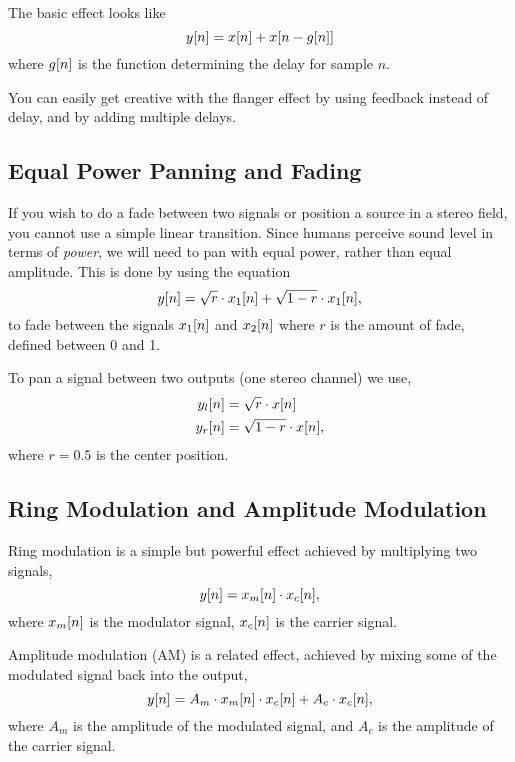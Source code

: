 \documentclass[11pt]{article}
\let\originalleft\left
\let\originalright\right
\renewcommand{\left}{\mathopen{}\mathclose\bgroup\originalleft}
\renewcommand{\right}{\aftergroup\egroup\originalright}
\def\lsqb{\left[}
\def\rsqb{\right]}
\def\sqb#1{\lsqb #1 \rsqb}
\def\ysig{y\sqb{n}}
\begin{document}
The basic effect looks like
\begin{equation}
	\ysig = x\sqb{n} + x\sqb{n - g\sqb{n}}
\end{equation}
where $g\sqb{n}$ is the function determining the delay for sample $n$.

You can easily get creative with the flanger effect by using feedback instead of delay, and by adding multiple delays.

\subsection{Equal Power Panning and Fading}
If you wish to do a fade between two signals or position a source in a stereo field, you cannot use a simple linear transition. Since humans perceive sound level in terms of \textit{power}, we will need to pan with equal power, rather than equal amplitude. This is done by using the equation
\begin{equation}
	\ysig = \sqrt{r} \cdot x_1\sqb{n} + \sqrt{1 - r} \cdot x_1\sqb{n},
\end{equation}
to fade between the signals $x_1\sqb{n}$ and $x_2\sqb{n}$ where $r$ is the amount of fade, defined between 0 and 1.

To pan a signal between two outputs (one stereo channel) we use,
\begin{align}
	y_l\sqb{n} &= \sqrt{r} \cdot x\sqb{n} \\
	y_r\sqb{n} &= \sqrt{1 - r} \cdot x\sqb{n},
\end{align}
where $r = 0.5$ is the center position.

\subsection{Ring Modulation and Amplitude Modulation}
Ring modulation is a simple but powerful effect achieved by multiplying two signals,
\begin{equation}
	\ysig = x_m\sqb{n} \cdot x_c\sqb{n},
\end{equation}
where $x_m\sqb{n}$ is the modulator signal, $x_c\sqb{n}$ is the carrier signal.

Amplitude modulation (AM) is a related effect, achieved by mixing some of the modulated signal back into the output,
\begin{equation}
	\ysig = A_m \cdot x_m\sqb{n} \cdot x_c\sqb{n} + A_c \cdot x_c\sqb{n},
\end{equation}
where $A_m$ is the amplitude of the modulated signal, and $A_c$ is the amplitude of the carrier signal.
\end{document}
